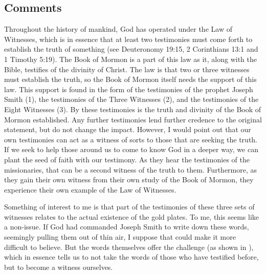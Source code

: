 \documentclass[12pt]{report}
\begin{document}
\subsection{Comments\label{intro:comments7}}
Throughout the history of mankind, God has operated under the Law of Witnesses, which is in essence that at least two testimonies must come forth to establish the truth of something (see Deuteronomy 19:15, 2 Corinthians 13:1 and 1 Timothy 5:19).  The Book of Mormon is a part of this law as it, along with the Bible, testifies of the divinity of Christ.  The law is that two or three witnesses must establish the truth, so the Book of Mormon itself needs the support of this law.  This support is found in the form of the testimonies of the prophet Joseph Smith (1), the testimonies of the Three Witnesses (2), and the testimonies of the Eight Witnesses (3).  By these testimonies is the truth and divinity of the Book of Mormon established.  Any further testimonies lend further credence to the original statement, but do not change the impact.  However, I would point out that our own testimonies can act as a witness of sorts to those that are seeking the truth.  If we seek to help those around us to come to know God in a deeper way, we can plant the seed of faith with our testimony.  As they hear the testimonies of the missionaries, that can be a second witness of the truth to them.  Furthermore, as they gain their own witness from their own study of the Book of Mormon, they experience their own example of the Law of Witnesses.

Something of interest to me is that part of the testimonies of these three sets of witnesses relates to the actual existence of the gold plates.  To me, this seems like a non-issue.  If God had commanded Joseph Smith to write down these words, seemingly pulling them out of thin air, I suppose that could make it more difficult to believe.  But the words themselves offer the challenge (as shown in ), which in essence tells us to not take the words of those who have testified before, but to become a witness ourselves.  
\end{document}
